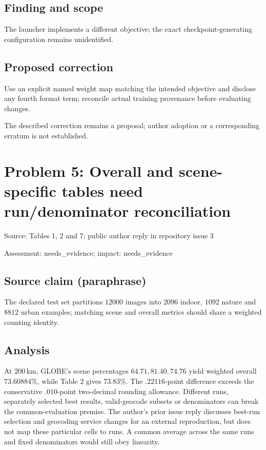 \documentclass[11pt]{article}
\begin{document}
\subsection*{Finding and scope}

The launcher implements a different objective; the exact checkpoint-generating configuration remains unidentified.

\subsection*{Proposed correction}

Use an explicit named weight map matching the intended objective and disclose any fourth format term; reconcile actual training provenance before evaluating changes.

The described correction remains a proposal; author adoption or a corresponding erratum is not established.

\section*{Problem 5: Overall and scene-specific tables need run/denominator reconciliation}

Source: Tables 1, 2 and 7; public author reply in repository issue 3

Assessment: needs\_evidence; impact: needs\_evidence

\subsection*{Source claim (paraphrase)}

The declared test set partitions \(12000\) images into \(2096\) indoor, \(1092\) nature and \(8812\) urban examples; matching scene and overall metrics should share a weighted counting identity.

\subsection*{Analysis}

At \(200\,\mathrm{km}\), GLOBE’s scene percentages \(64.71,81.40,74.76\) yield weighted overall \(73.60884\%\), while Table 2 gives \(73.83\%\). The \(.22116\)-point difference exceeds the conservative \(.010\)-point two-decimal rounding allowance. Different runs, separately selected best results, valid-geocode subsets or denominators can break the common-evaluation premise. The author’s prior issue reply discusses best-run selection and geocoding service changes for an external reproduction, but does not map these particular cells to runs. A common average across the same runs and fixed denominators would still obey linearity.
\end{document}
